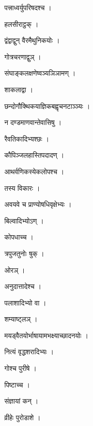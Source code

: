\documentclass[10pt, openany]{book}
\begin{document}
\noindent पत्त्राध्वर्युपरिषदश्च ।

\noindent हलसीराट्ठक् ।

\noindent द्वंद्वाद्वुन् वैरमैथुनिकयोः ।

\noindent गोत्रचरणाद्वुञ् ।

\noindent संघाङ्कलक्षणेष्वञ्यञिञामण् ।

\noindent शाकलाद्वा ।

\noindent छन्दोगौक्थिकयाज्ञिकबह्वृचनटाञ्ञ्यः ।

\noindent न दण्डमाणवान्तेवासिषु ।

\noindent रैवतिकादिभ्यश्छः ।

\noindent कौपिञ्जलहास्तिपदादण् ।

\noindent आथर्वणिकस्येकलोपश्च ।

\noindent तस्य विकारः ।

\noindent अवयवे च प्राण्योषधिवृक्षेभ्यः ।

\noindent बिल्वादिभ्योऽण् ।

\noindent कोपधाच्च ।

\noindent त्रपुजतुनोः षुक् ।

\noindent ओरञ् ।

\noindent अनुदात्तादेश्च ।

\noindent पलाशादिभ्यो वा ।

\noindent शम्याष्ट्लञ् ।

\noindent मयड्वैतयोर्भाषायामभक्ष्याच्छादनयोः ।

\noindent नित्यं वृद्धशरादिभ्यः ।

\noindent गोश्च पुरीषे ।

\noindent पिष्टाच्च ।

\noindent संज्ञायां कन् ।

\noindent व्रीहेः पुरोडाशे ।
\end{document}
